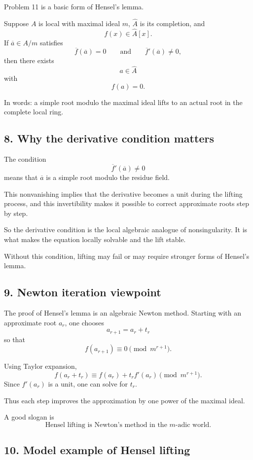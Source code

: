 \documentclass[12pt,a4paper]{article}
\theoremstyle{plain}
\theoremstyle{definition}      %
\begin{document}
	Problem 11 is a basic form of Hensel's lemma.
	
	Suppose \(A\) is local with maximal ideal \(m\), \(\widehat A\) is its completion, and
	\[
	f(x)\in \widehat A[x].
	\]
	If \(\overline a\in A/m\) satisfies
	\[
	\overline f(\overline a)=0
	\qquad\text{and}\qquad
	\overline f'(\overline a)\neq 0,
	\]
	then there exists
	\[
	a\in \widehat A
	\]
	with
	\[
	f(a)=0.
	\]
	
	In words: a simple root modulo the maximal ideal lifts to an actual root in the complete local ring.
	
	\subsection*{8. Why the derivative condition matters}
	
	The condition
	\[
	\overline f'(\overline a)\neq 0
	\]
	means that \(\overline a\) is a simple root modulo the residue field.
	
	This nonvanishing implies that the derivative becomes a unit during the lifting process, and this invertibility makes it possible to correct approximate roots step by step.
	
	So the derivative condition is the local algebraic analogue of nonsingularity. It is what makes the equation locally solvable and the lift stable.
	
	Without this condition, lifting may fail or may require stronger forms of Hensel's lemma.
	
	\subsection*{9. Newton iteration viewpoint}
	
	The proof of Hensel's lemma is an algebraic Newton method. Starting with an approximate root \(a_r\), one chooses
	\[
	a_{r+1}=a_r+t_r
	\]
	so that
	\[
	f(a_{r+1})\equiv 0 \pmod{m^{r+1}}.
	\]
	
	Using Taylor expansion,
	\[
	f(a_r+t_r)\equiv f(a_r)+t_r f'(a_r) \pmod{m^{r+1}}.
	\]
	Since \(f'(a_r)\) is a unit, one can solve for \(t_r\).
	
	Thus each step improves the approximation by one power of the maximal ideal.
	
	A good slogan is
	\[
	\boxed{\text{Hensel lifting is Newton's method in the }m\text{-adic world.}}
	\]
	
	\subsection*{10. Model example of Hensel lifting}
	
\end{document}
